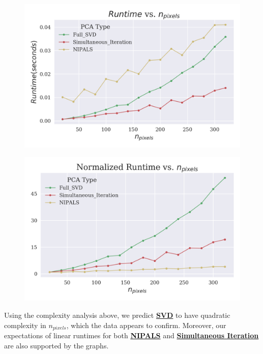 \documentclass[12pt]{article}
\begin{document}
\begin{figure}[H]
\centering
\begin{minipage}{.45\textwidth}
  \centering
  \includegraphics[width=\linewidth]{U_Pixels.png}
  \label{UPixels}
\end{minipage}%
\quad
\begin{minipage}{.45\textwidth}
  \centering
  \includegraphics[width=\linewidth]{N_Pixels.png}
  \label{NPixels}
\end{minipage}
\end{figure}

Using the complexity analysis above, we predict \textbf{\hyperref[3.2]{SVD}} to have quadratic complexity in $n_{pixels}$, which the data appears to confirm. Moreover, our expectations of linear runtimes for both \textbf{\hyperref[3.1]{NIPALS}} and \textbf{\hyperref[3.3]{Simultaneous Iteration}} are also supported by the graphs.
\end{document}

